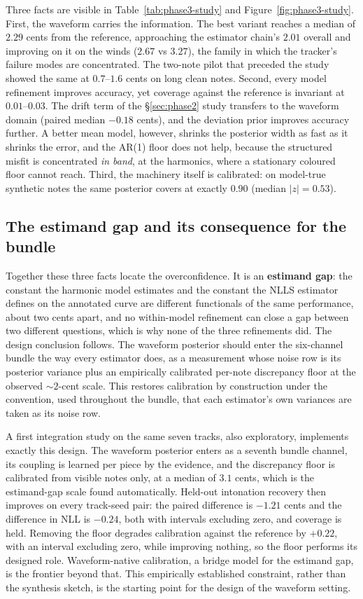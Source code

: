 Three facts are visible in Table~\ref{tab:phase3-study} and
Figure~\ref{fig:phase3-study}. First, the waveform carries the information.
The best variant reaches a median of $2.29$ cents from the reference,
approaching the estimator chain's $2.01$ overall and improving on it on the
winds ($2.67$ vs $3.27$), the family in which the tracker's failure modes
are concentrated. The two-note pilot that preceded the study showed the same
at $0.7$--$1.6$ cents on long clean notes. Second, every model refinement
improves accuracy, yet coverage against the reference is invariant at
$0.01$--$0.03$. The drift term of the \S\ref{sec:phase2} study transfers to
the waveform domain (paired median $-0.18$ cents), and the deviation prior
improves accuracy further. A better mean model, however, shrinks the
posterior width as fast as it shrinks the error, and the AR(1) floor does
not help, because the structured misfit is concentrated \emph{in band}, at
the harmonics, where a stationary coloured floor cannot reach. Third, the
machinery itself is calibrated: on model-true synthetic notes the same
posterior covers at exactly $0.90$ (median $|z| = 0.53$).

\subsection{The estimand gap and its consequence for the bundle}

Together these three facts locate the overconfidence. It is an
\textbf{estimand gap}: the constant the harmonic model estimates and the
constant the NLLS estimator defines on the annotated curve are different
functionals of the same performance, about two cents apart, and no
within-model refinement can close a gap between two different questions,
which is why none of the three refinements did. The design conclusion
follows. The waveform posterior should enter the six-channel bundle the way
every estimator does, as a measurement whose noise row is its posterior
variance plus an empirically calibrated per-note discrepancy floor at the
observed $\sim 2$-cent scale. This restores calibration by construction
under the convention, used throughout the bundle, that each estimator's own
variances are taken as its noise row.

A first integration study on the same seven tracks, also exploratory,
implements exactly this design. The waveform posterior enters as a seventh
bundle channel, its coupling is learned per piece by the evidence, and the
discrepancy floor is calibrated from visible notes only, at a median of
$3.1$ cents, which is the estimand-gap scale found automatically. Held-out
intonation recovery then improves on every track-seed pair: the paired
difference is $-1.21$ cents and the difference in NLL is $-0.24$, both with
intervals excluding zero, and coverage is held. Removing the floor degrades
calibration against the reference by $+0.22$, with an interval excluding
zero, while improving nothing, so the floor performs its designed role.
Waveform-native calibration, a bridge model for the estimand gap, is the
frontier beyond that. This empirically established constraint, rather than
the synthesis sketch, is the starting point for the design of the waveform
setting.

